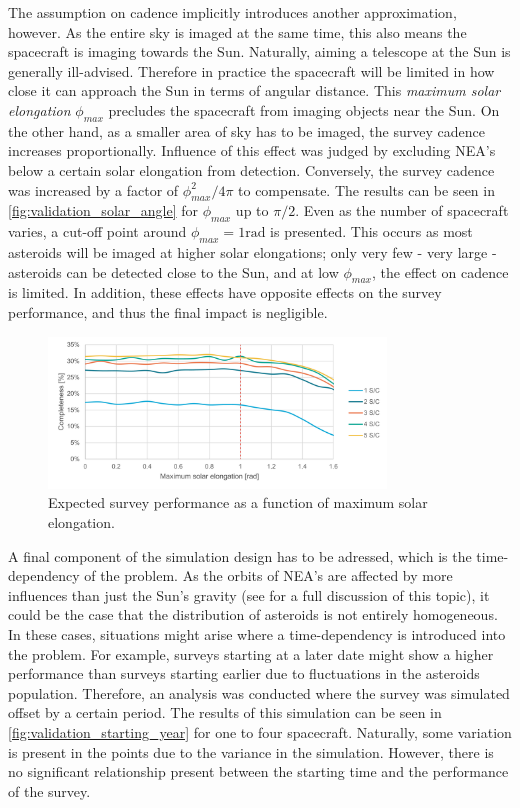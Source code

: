 The assumption on cadence implicitly introduces another approximation, however. As the entire sky is imaged at the same time, this also means the spacecraft is imaging towards the Sun. Naturally, aiming a telescope at the Sun is generally ill-advised. Therefore in practice the spacecraft will be limited in how close it can approach the Sun in terms of angular distance. This \textit{maximum solar elongation} $\phi_{max}$ precludes the spacecraft from imaging objects near the Sun. On the other hand, as a smaller area of sky has to be imaged, the survey cadence increases proportionally. Influence of this effect was judged by excluding NEA's below a certain solar elongation from detection. Conversely, the survey cadence was increased by a factor of $\phi_{max}^2 / 4\pi$ to compensate. The results can be seen in \autoref{fig:validation_solar_angle} for $\phi_{max}$ up to $\pi/2$. Even as the number of spacecraft varies, a cut-off point around $\phi_{max} = 1\mathrm{rad}$ is presented. This occurs as most asteroids will be imaged at higher solar elongations; only very few - very large - asteroids can be detected close to the Sun, and at low $\phi_{max}$, the effect on cadence is limited. In addition, these effects have opposite effects on the survey performance, and thus the final impact is negligible.

\begin{figure}[htbp]
 \centering
 \includegraphics[width=0.8\textwidth]{img/validation_solar_angle.pdf}
 \caption{Expected survey performance as a function of maximum solar elongation.}
 \label{fig:validation_solar_angle}
\end{figure}

A final component of the simulation design has to be adressed, which is the time-dependency of the problem. As the orbits of NEA's are affected by more influences than just the Sun's gravity (see \cite{GranvikPopulation} for a full discussion of this topic), it could be the case that the distribution of asteroids is not entirely homogeneous. In these cases, situations might arise where a time-dependency is introduced into the problem. For example, surveys starting at a later date might show a higher performance than surveys starting earlier due to fluctuations in the asteroids population. Therefore, an analysis was conducted where the survey was simulated offset by a certain period. The results of this simulation can be seen in \autoref{fig:validation_starting_year} for one to four spacecraft. Naturally, some variation is present in the points due to the variance in the simulation. However, there is no significant relationship present between the starting time and the performance of the survey.


